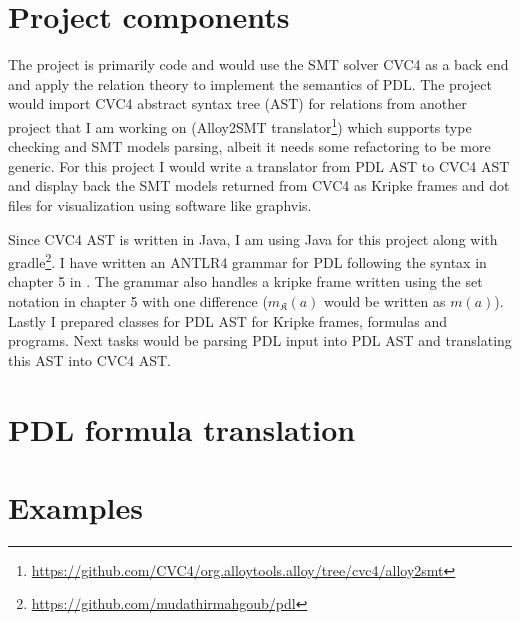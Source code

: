 \documentclass[12pt,a4paper]{article}
\begin{document}
\section{Project components}

The project is primarily code and would use the SMT solver CVC4 as a back end and apply the relation theory to implement the semantics of PDL. The project would import CVC4 abstract syntax tree (AST) for relations from another project that I am working on (Alloy2SMT translator\footnote{\url{https://github.com/CVC4/org.alloytools.alloy/tree/cvc4/alloy2smt}}) which supports type checking and SMT models parsing, albeit it needs some refactoring to be more generic.  For this project I would write a translator from PDL AST to CVC4 AST and display back the SMT models returned from CVC4 as Kripke frames and dot files for visualization using software like graphvis.

Since CVC4 AST is written in Java, I am using Java for this project along with  gradle\footnote{\url{https://github.com/mudathirmahgoub/pdl}}. I have written an ANTLR4 grammar for PDL following the syntax in chapter 5 in \cite{dynamic}. The grammar also handles a kripke frame written using the set notation in chapter 5 with one difference ($m_{\mathfrak{K}}(a)$ would be written as $m(a)$). Lastly I  prepared classes for PDL AST for Kripke frames, formulas and programs. Next tasks would be parsing PDL input into PDL AST and translating this AST into CVC4 AST. 


\section{PDL formula translation}



\section{Examples}






\end{document}

